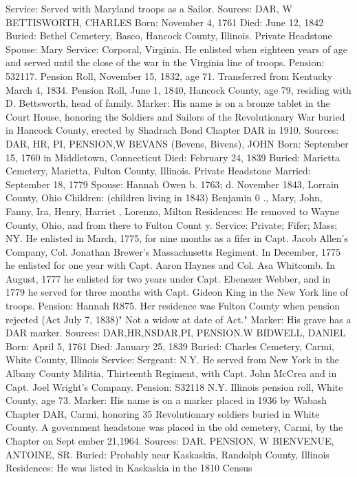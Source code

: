 Service: Served with Maryland troops as a Sailor. 
Sources: DAR, W 
BETTISWORTH, CHARLES
Born: November 4, 1761 
Died: June 12, 1842  
Buried: Bethel Cemetery, Basco, Hancock County, Illinois. Private Headstone 
Spouse: Mary 
Service: Corporal, Virginia. He enlisted when eighteen years of age and served until the close of the war in the Virginia line of troops. 
Pension: 532117. Pension Roll, November 15, 1832, age 71. Transferred from Kentucky March 4, 1834. Pension Roll, June 1, 1840, Hancock County, age 79, residing with D. Bettsworth, head of family. 
Marker: His name is on a bronze tablet in the Court House, honoring the Sol­diers and Sailors of the Revolutionary War buried in Hancock County, erected by Shadrach Bond Chapter DAR in 1910. 
Sources: DAR, HR, PI, PENSION,W 
BEVANS (Bevens, Bivens), JOHN 
Born: September 15, 1760 in Middletown, Connecticut 
Died: February 24, 1839 
Buried: Marietta Cemetery, Marietta, Fulton County, Illinois. Private Headstone 
Married: September 18, 1779 
Spouse: Hannah Owen b. 1763; d. November 1843, Lorrain County, Ohio 
Children: (children living in 1843) Benjamin 0 ., Mary, John, Fanny, Ira, Henry, Harriet , Lorenzo, Milton 
Residences: He removed to Wayne County, Ohio, and from there to Fulton Count y. 
Service: Private; Fifer; Mass; NY. He enlisted in March, 1775, for nine months as a fifer in Capt. Jacob Allen's Company, Col. Jonathan Brewer's Massa­chusetts Regiment. In December, 1775 he enlisted for one year with Capt. Aaron Haynes and Col. Asa Whitcomb. In August, 1777 he enlisted for two years under Capt. Ebenezer Webber, and in 1779 he served for three months with Capt. Gideon King in the New York line of troops. 
Pension: Hannah R875. Her residence was Fulton County when pension rejected (Act July 7, 1838)" Not a widow at date of Act." 
Marker: His grave has a DAR marker. 
Sources: DAR,HR,NSDAR,PI, PENSION.W 
BIDWELL, DANIEL 
Born: April 5, 1761 
Died: January 25, 1839 
Buried: Charles Cemetery, Carmi, White County, Illinois 
Service: Sergeant: N.Y. He served from New York in the Albany County Militia, Thirteenth Regiment, with Capt. John McCrea and in Capt. Joel Wright's Company. 
Pension: S32118 N.Y. Illinois pension roll, White County, age 73. 
Marker: His name is on a marker placed in 1936 by Wabash Chapter DAR, Carmi, honoring 35 Revolutionary soldiers buried in White County. A gov­ernment headstone was placed in the old cemetery, Carmi, by the Chapter on Sept ember 21,1964. 
Sources: DAR. PENSION, W 
BIENVENUE, ANTOINE, SR. 
Buried: Probably near Kaskaskia, Randolph County, Illinois 
Residences: He was listed in Kaskaskia in the 1810 Census 
